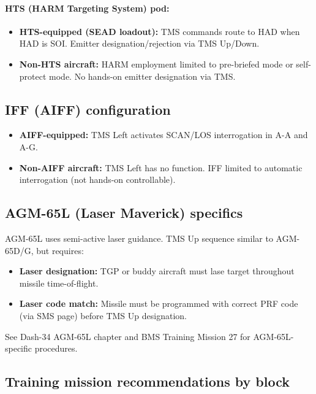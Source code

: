 \documentclass[11pt, a4paper, twoside]{report}
\begin{document}
\paragraph{HTS (HARM Targeting System) pod:}
\begin{itemize}
    \item \textbf{HTS-equipped (SEAD loadout):} TMS commands route to HAD when HAD is SOI. Emitter designation/rejection via TMS Up/Down.
    \item \textbf{Non-HTS aircraft:} HARM employment limited to pre-briefed mode or self-protect mode. No hands-on emitter designation via TMS.
\end{itemize}

\subsection{IFF (AIFF) configuration}
\label{sec:C4-S6-S2}

\begin{itemize}
    \item \textbf{AIFF-equipped:} TMS Left activates SCAN/LOS interrogation in A-A and A-G.
    \item \textbf{Non-AIFF aircraft:} TMS Left has no function. IFF limited to automatic interrogation (not hands-on controllable).
\end{itemize}

\subsection{AGM-65L (Laser Maverick) specifics}
\label{sec:C4-S6-S3}

AGM-65L uses semi-active laser guidance. TMS Up sequence similar to AGM-65D/G, but requires:
\begin{itemize}
    \item \textbf{Laser designation:} TGP or buddy aircraft must lase target throughout missile time-of-flight.
    \item \textbf{Laser code match:} Missile must be programmed with correct PRF code (via SMS page) before TMS Up designation.
\end{itemize}

See Dash-34 AGM-65L chapter and BMS Training Mission 27 for AGM-65L-specific procedures.

\subsection{Training mission recommendations by block}
\label{sec:C4-S6-S4}
\end{document}
